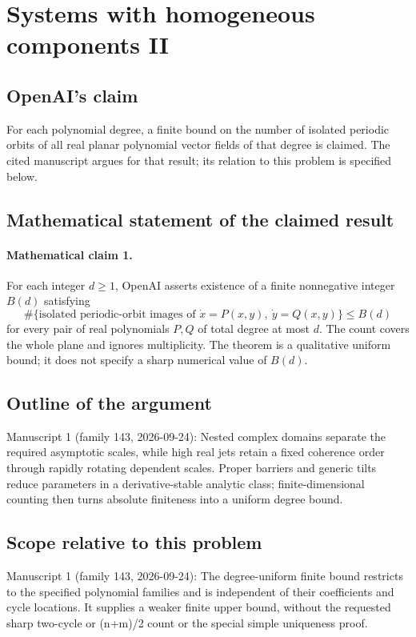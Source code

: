 \documentclass[11pt]{article}
\begin{document}
\section*{Systems with homogeneous components II}

\subsection{OpenAI's claim}
For each polynomial degree, a finite bound on the number of isolated periodic orbits of all real planar polynomial vector fields of that degree is claimed. The cited manuscript argues for that result; its relation to this problem is specified below.

\subsection{Mathematical statement of the claimed result}
\paragraph{Mathematical claim 1.} For each integer $d\ge1$, OpenAI asserts existence of a finite nonnegative integer $B(d)$ satisfying
\[
\#\{\text{isolated periodic-orbit images of }\dot x=P(x,y),\ \dot y=Q(x,y)\}\le B(d)
\]
for every pair of real polynomials $P,Q$ of total degree at most $d$. The count covers the whole plane and ignores multiplicity. The theorem is a qualitative uniform bound; it does not specify a sharp numerical value of $B(d)$.

\subsection{Outline of the argument}
Manuscript 1 (family 143, 2026-09-24): Nested complex domains separate the required asymptotic scales, while high real jets retain a fixed coherence order through rapidly rotating dependent scales. Proper barriers and generic tilts reduce parameters in a derivative-stable analytic class; finite-dimensional counting then turns absolute finiteness into a uniform degree bound.

\subsection{Scope relative to this problem}
Manuscript 1 (family 143, 2026-09-24): The degree-uniform finite bound restricts to the specified polynomial families and is independent of their coefficients and cycle locations. It supplies a weaker finite upper bound, without the requested sharp two-cycle or (n+m)/2 count or the special simple uniqueness proof.
\end{document}
